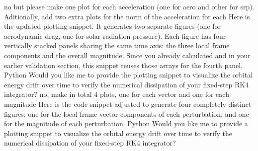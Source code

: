 {}no but please make one plot for each acceleration (one for aero and other for srp). Aditionally, add two extra plots for the norm of the acceleration for each\markdownRendererInterblockSeparator
{}
\markdownRendererSectionEnd \markdownRendererSectionBegin
{}\markdownRendererInterblockSeparator
{}Here is the updated plotting snippet. It generates two separate figures (one for aerodynamic drag, one for solar radiation pressure). Each figure has four vertically stacked panels sharing the same time axis: the three local frame components and the overall magnitude.\markdownRendererInterblockSeparator
{}Since you already calculated  and  in your earlier validation section, this snippet reuses those arrays for the fourth panel.\markdownRendererInterblockSeparator
{}Python\markdownRendererInterblockSeparator
{}\markdownRendererInterblockSeparator
{}Would you like me to provide the plotting snippet to visualize the orbital energy drift over time to verify the numerical dissipation of your fixed-step RK4 integrator?\markdownRendererInterblockSeparator
{}\markdownRendererThematicBreak{}\markdownRendererInterblockSeparator
{}
\markdownRendererSectionEnd \markdownRendererSectionBegin
{}\markdownRendererInterblockSeparator
{}no, make in total 4 plots, one for each vector and one for each magnitude\markdownRendererInterblockSeparator
{}
\markdownRendererSectionEnd \markdownRendererSectionBegin
{}\markdownRendererInterblockSeparator
{}Here is the code snippet adjusted to generate four completely distinct figures: one for the local frame vector components of each perturbation, and one for the magnitude of each perturbation.\markdownRendererInterblockSeparator
{}Python\markdownRendererInterblockSeparator
{}\markdownRendererInterblockSeparator
{}Would you like me to provide a plotting snippet to visualize the orbital energy drift over time to verify the numerical dissipation of your fixed-step RK4 integrator?\markdownRendererInterblockSeparator
{}\markdownRendererThematicBreak{}\markdownRendererInterblockSeparator

